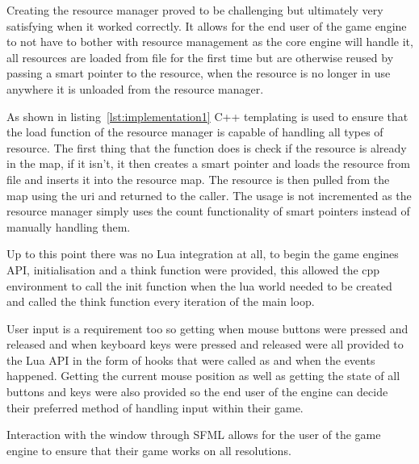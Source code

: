 \documentclass[11pt,a4paper,titlepage]{report}
\begin{document}

	Creating the resource manager proved to be challenging but ultimately very satisfying when it worked correctly. It allows for the end user of the game engine to not have to bother with resource management as the core engine will handle it, all resources are loaded from file for the first time but are otherwise reused by passing a smart pointer to the resource, when the resource is no longer in use anywhere it is unloaded from the resource manager.
	
	

	As shown in listing~\ref{lst:implementation1} C++ templating is used to ensure that the load function of the resource manager is capable of handling all types of resource. The first thing that the function does is check if the resource is already in the map, if it isn't, it then creates a smart pointer and loads the resource from file and inserts it into the resource map. The resource is then pulled from the map using the uri and returned to the caller. The usage is not incremented as the resource manager simply uses the count functionality of smart pointers instead of manually handling them.


    Up to this point there was no Lua integration at all, to begin the game engines API, initialisation and a think function were provided, this allowed the cpp environment to call the init function when the lua world needed to be created and called the think function every iteration of the main loop.

    User input is a requirement too so getting when mouse buttons were pressed and released and when keyboard keys were pressed and released were all provided to the Lua API in the form of hooks that were called as and when the events happened. Getting the current mouse position as well as getting the state of all buttons and keys were also provided so the end user of the engine can decide their preferred method of handling input within their game.


   Interaction with the window through SFML allows for the user of the game engine to ensure that their game works on all resolutions.
\end{document}
